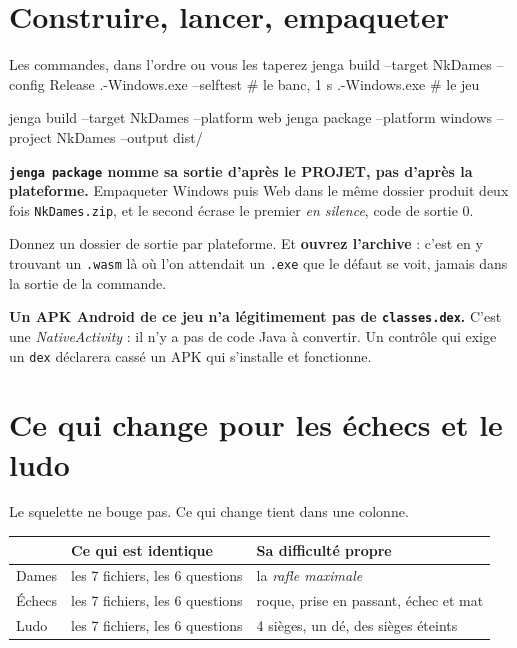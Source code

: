 \section{Construire, lancer, empaqueter}

\begin{nkcode}{Les commandes, dans l'ordre ou vous les taperez}
jenga build --target NkDames --config Release
.\Build\Bin\Release-Windows\NkDames\NkDames.exe --selftest    # le banc, 1 s
.\Build\Bin\Release-Windows\NkDames\NkDames.exe               # le jeu

jenga build --target NkDames --platform web
jenga package --platform windows --project NkDames --output dist/
\end{nkcode}

\begin{nkpiege}
\textbf{\texttt{jenga package} nomme sa sortie d'après le PROJET, pas d'après la
plateforme.} Empaqueter Windows puis Web dans le même dossier produit deux fois
\texttt{NkDames.zip}, et le second écrase le premier \emph{en silence}, code de
sortie 0.

Donnez un dossier de sortie par plateforme. Et \textbf{ouvrez l'archive} : c'est
en y trouvant un \texttt{.wasm} là où l'on attendait un \texttt{.exe} que le
défaut se voit, jamais dans la sortie de la commande.
\end{nkpiege}

\begin{nkretenir}
\textbf{Un APK Android de ce jeu n'a légitimement pas de \texttt{classes.dex}.}
C'est une \emph{NativeActivity} : il n'y a pas de code Java à convertir. Un
contrôle qui exige un \texttt{dex} déclarera cassé un APK qui s'installe et
fonctionne.
\end{nkretenir}

\section{Ce qui change pour les échecs et le ludo}

Le squelette ne bouge pas. Ce qui change tient dans une colonne.

\begin{center}
\begin{tabular}{@{}lll@{}}
\toprule
& \textbf{Ce qui est identique} & \textbf{Sa difficulté propre} \\
\midrule
Dames & les 7 fichiers, les 6 questions & la \emph{rafle maximale} \\
Échecs & les 7 fichiers, les 6 questions & roque, prise en passant, échec et mat \\
Ludo & les 7 fichiers, les 6 questions & 4 sièges, un dé, des sièges éteints \\
\bottomrule
\end{tabular}
\end{center}


